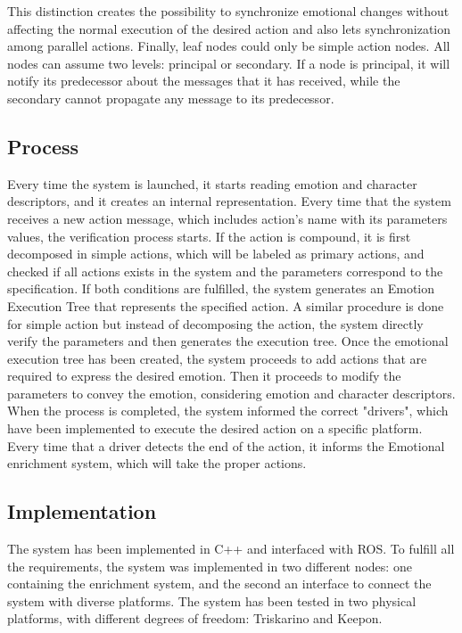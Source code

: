 \documentclass{sig-alternate-05-2015}
\begin{document}
This distinction creates the possibility to synchronize emotional changes without affecting the normal execution of the desired action and also lets synchronization among parallel actions. Finally, leaf nodes could only be simple action nodes. All nodes can assume two levels: principal or  secondary. If a node is principal, it will notify its predecessor about the messages that it has received, while the secondary cannot propagate any message to its predecessor.

\subsection{Process}

Every time the system is launched, it starts reading emotion and character descriptors, and it creates an internal representation. Every time that the system receives a new action message, which includes action's name with its parameters values, the verification process starts. If the action is compound, it is first decomposed in simple actions, which will be labeled as primary actions, and checked if all actions exists in the system and the parameters correspond to the specification. If both conditions are fulfilled, the system generates an Emotion Execution Tree that represents the specified action. A similar procedure is done for simple action but instead of decomposing the action, the system directly verify the parameters and then generates the execution tree. Once the emotional execution tree has been created, the system proceeds to add actions that are required to express the desired emotion. Then it proceeds to modify the parameters to convey the emotion, considering emotion and character descriptors. When the process is completed, the system informed the correct "drivers", which have been implemented to execute the desired action on a specific platform. Every time that a driver detects the end of the action, it informs the Emotional enrichment system, which will take the proper actions.

\subsection{Implementation}

The system has been implemented in C++ and interfaced with ROS. To fulfill all the requirements, the system was implemented in two different nodes: one containing the enrichment system, and the second an interface to connect the system with diverse platforms. The system has been tested in two physical platforms, with different degrees of freedom: Triskarino and Keepon. 
\end{document}
